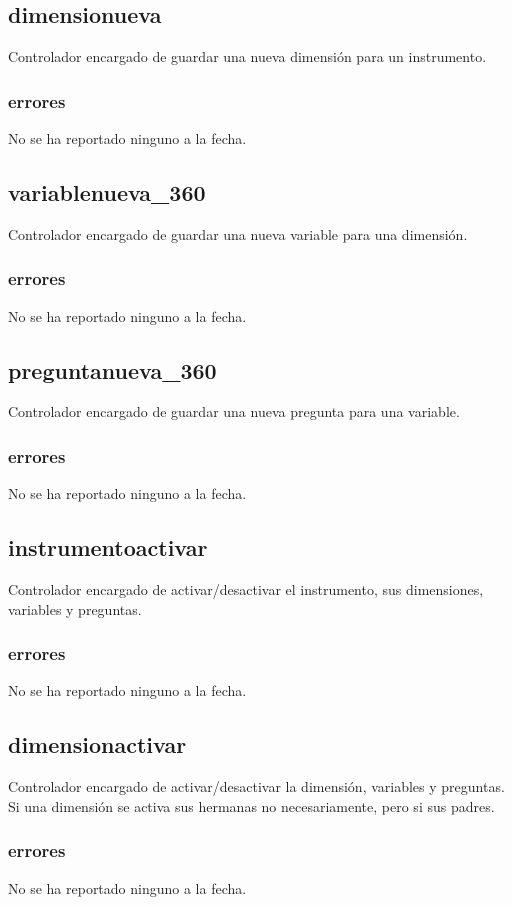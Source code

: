 \documentclass[10pt,a4paper]{book}
\begin{document}
	\subsection{dimensionueva}
	Controlador encargado de guardar una nueva dimensión para un instrumento.
	\subsubsection{errores}
	No se ha reportado ninguno a la fecha.

	\subsection{variablenueva\_360}
	Controlador encargado de guardar una nueva variable para una dimensión.
	\subsubsection{errores}
	No se ha reportado ninguno a la fecha.

	\subsection{preguntanueva\_360}
	Controlador encargado de guardar una nueva pregunta para una variable.
	\subsubsection{errores}
	No se ha reportado ninguno a la fecha.

	\subsection{instrumentoactivar}
	Controlador encargado de activar/desactivar el instrumento, sus dimensiones, variables y preguntas.
	\subsubsection{errores}
	No se ha reportado ninguno a la fecha.

	\subsection{dimensionactivar}
	Controlador encargado de activar/desactivar la dimensión, variables y preguntas. Si una dimensión se activa sus hermanas no necesariamente, pero si sus padres.
	\subsubsection{errores}
	No se ha reportado ninguno a la fecha.
\end{document}
